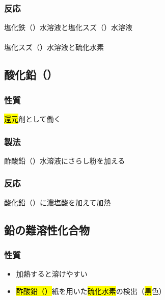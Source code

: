 \subsubsection{反応}
塩化鉄（）水溶液と塩化スズ（）水溶液\\
\\
 塩化スズ（）水溶液と硫化水素\\
\subsection{酸化鉛（）}
\subsubsection{性質}
\hl{還元}剤として働く\\
\subsubsection{製法}
酢酸鉛（）水溶液にさらし粉を加える
\subsubsection{反応}
酸化鉛（）に濃塩酸を加えて加熱\\
\subsection{鉛の難溶性化合物}
\subsubsection{性質}
\begin{itemize}
  \item 加熱すると溶けやすい
  \item \hl{酢酸鉛（）}紙を用いた\hl{硫化水素}の検出（\hl{黒}色）
\end{itemize}
